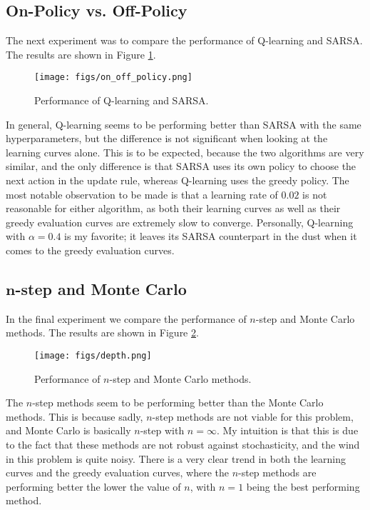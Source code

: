 \documentclass{article}
\begin{document}
\subsection{On-Policy vs. Off-Policy}
\label{ssec:resonoff}

The next experiment was to compare the performance of Q-learning and SARSA.
The results are shown in Figure \ref{fig:onoff}.

\begin{figure}[htbp]
    \centering
    \texttt{[image: figs/on\_off\_policy.png]}
    \caption{Performance of Q-learning and SARSA.}
    \label{fig:onoff}
\end{figure}

In general, Q-learning seems to be performing better than SARSA with the same hyperparameters, but the difference is not significant when looking at the learning curves alone.
This is to be expected, because the two algorithms are very similar, and the only difference is that SARSA uses its own policy to choose the next action in the update rule, whereas Q-learning uses the greedy policy.
The most notable observation to be made is that a learning rate of $0.02$ is not reasonable for either algorithm, as both their learning curves as well as their greedy evaluation curves are extremely slow to converge.
Personally, Q-learning with $\alpha = 0.4$ is my favorite; it leaves its SARSA counterpart in the dust when it comes to the greedy evaluation curves.

\subsection{$\mathbf{n}$-step and Monte Carlo}
\label{ssec:resnm}

In the final experiment we compare the performance of $n$-step and Monte Carlo methods.
The results are shown in Figure \ref{fig:nm}.

\begin{figure}[htbp]
    \centering
    \texttt{[image: figs/depth.png]}
    \caption{Performance of $n$-step and Monte Carlo methods.}
    \label{fig:nm}
\end{figure}

The $n$-step methods seem to be performing better than the Monte Carlo methods.
This is because sadly, $n$-step methods are not viable for this problem, and Monte Carlo is basically $n$-step with $n = \infty$.
My intuition is that this is due to the fact that these methods are not robust against stochasticity, and the wind in this problem is quite noisy.
There is a very clear trend in both the learning curves and the greedy evaluation curves, where the $n$-step methods are performing better the lower the value of $n$, with $n = 1$ being the best performing method.
\end{document}
